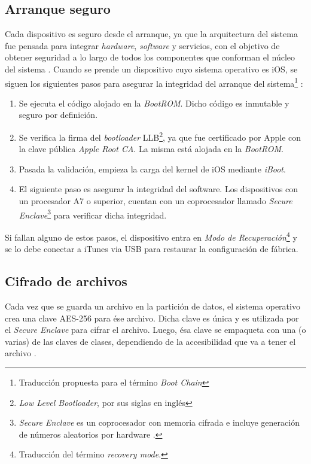 \subsection{Arranque seguro}\label{fig:ch02:arranque}
Cada dispositivo es seguro desde el arranque, ya que la arquitectura del sistema fue pensada para integrar \textit{hardware}, \textit{software} y servicios, con el objetivo de obtener seguridad a lo largo de todos los componentes que conforman el núcleo del sistema \cite{asg}. Cuando se prende un dispositivo cuyo sistema operativo es iOS, se siguen los siguientes pasos para asegurar la integridad del arranque del sistema\footnote{Traducción propuesta para el término \textit{Boot Chain}} :
\begin{enumerate}
	\item Se ejecuta el código alojado en la \textit{BootROM}. Dicho código es inmutable y seguro por definición.
	\item Se verifica la firma del \textit{bootloader} LLB\footnote{\textit{Low Level Bootloader}, por sus siglas en inglés}, ya que fue certificado por Apple con la clave pública \textit{Apple Root CA}. La misma está alojada en la \textit{BootROM}. 
	\item Pasada la validación, empieza la carga del kernel de iOS mediante \textit{iBoot}.
	\item El siguiente paso es asegurar la integridad del software. Los dispositivos con un procesador A7 o superior, cuentan con un coprocesador llamado \textit{Secure Enclave}\footnote{\textit{Secure Enclave} es un coprocesador con memoria cifrada e incluye generación de números aleatorios por hardware \cite{asg}.} para verificar dicha integridad.
\end{enumerate}
Si fallan alguno de estos pasos, el dispositivo entra en \emph{Modo de Recuperación}\footnote{Traducción del término \textit{recovery mode}.} y se lo debe conectar a iTunes via USB para restaurar la configuración de fábrica.
\subsection{Cifrado de archivos}
Cada vez que se guarda un archivo en la partición de datos, el sistema operativo crea una clave AES-256 para ése archivo. Dicha clave es única y es utilizada por el \textit{Secure Enclave} para cifrar el archivo. Luego, ésa clave se empaqueta con una (o varias) de las claves de clases, dependiendo de la accesibilidad que va a tener el archivo \cite{asg}.\\

